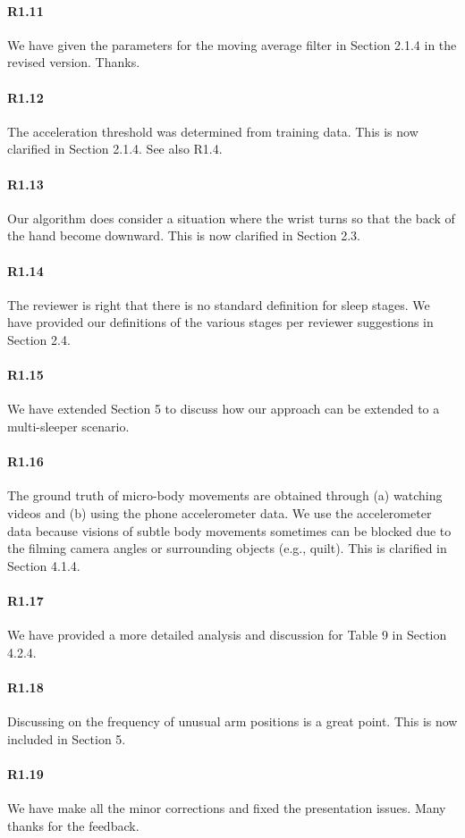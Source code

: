 \paragraph{R1.11} We have given the parameters for the moving average filter in Section 2.1.4 in the revised version. Thanks.
\vspace{-2mm}
\paragraph{R1.12} The acceleration threshold was determined from training data. This is now clarified in Section 2.1.4. See also
R1.4. \vspace{-2mm}
\paragraph{R1.13} Our algorithm does consider a situation where the wrist turns so that the back of the hand become downward. This is now clarified in Section 2.3.
\vspace{-2mm}
\paragraph{R1.14} The reviewer is right that there is no standard definition for sleep stages. We have provided our definitions of the various stages per reviewer suggestions in Section 2.4.

\paragraph{R1.15} We have extended Section 5 to discuss how our approach can be extended to a multi-sleeper scenario.
\vspace{-2mm}
\paragraph{R1.16} The ground truth of micro-body movements are obtained through (a) watching videos and (b) using the phone accelerometer data. We use the accelerometer data because visions of subtle body movements sometimes can be blocked due to the filming camera angles or surrounding objects (e.g., quilt). This is clarified in Section 4.1.4.

\paragraph{R1.17} We have provided a more detailed analysis and discussion for Table 9 in Section 4.2.4.
\vspace{-2mm}
\paragraph{R1.18} Discussing on the frequency of unusual arm positions is a great point. This is now included in Section 5.
\vspace{-2mm}
\paragraph{R1.19} We have make all the minor corrections and fixed the presentation issues. Many thanks for the feedback.
